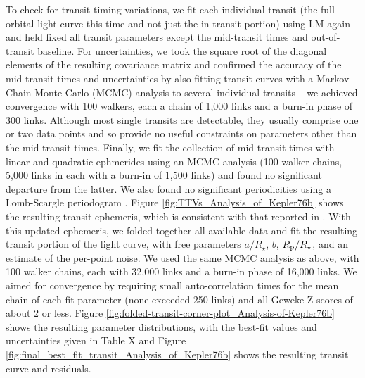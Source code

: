 \documentclass[manuscript]{aastex62}
\begin{document}
To check for transit-timing variations, we fit each individual transit (the full orbital light curve this time and not just the in-transit portion) using LM again and held fixed all transit parameters except the mid-transit times and out-of-transit baseline. For uncertainties, we took the square root of the diagonal elements of the resulting covariance matrix \citep[p.~790]{Press:2007:NRE:1403886} and confirmed the accuracy of the mid-transit times and uncertainties by also fitting transit curves with a Markov-Chain Monte-Carlo (MCMC) analysis \citep{2013PASP..125..306F} to several individual transits -- we achieved convergence with 100 walkers, each a chain of 1,000 links and a burn-in phase of 300 links. Although most single transits are detectable, they usually comprise one or two data points and so provide no useful constraints on parameters other than the mid-transit times. Finally, we fit the collection of mid-transit times with linear and quadratic ephmerides using an MCMC analysis (100 walker chains, 5,000 links in each with a burn-in of 1,500 links) and found no significant departure from the latter. We also found no significant periodicities using a Lomb-Scargle periodogram \citep{1976Ap&SS..39..447L, 1982ApJ...263..835S}. Figure \ref{fig:TTVs_Analysis_of_Kepler76b} shows the resulting transit ephemeris, which is consistent with that reported in \citet{2013ApJ...771...26F}. With this updated ephemeris, we folded together all available data and fit the resulting transit portion of the light curve, with free parameters $a/R_\star$, $b$, $R_{\rm p}/R_\star$, and an estimate of the per-point noise. We used the same MCMC analysis as above, with 100 walker chains, each with 32,000 links and a burn-in phase of 16,000 links. We aimed for convergence by requiring small auto-correlation times \citep[e.g][]{geyer1992} for the mean chain of each fit parameter (none exceeded 250 links) and all Geweke Z-scores \citep{Geweke92evaluatingthe} of about 2 or less. Figure \ref{fig:folded-transit-corner-plot_Analysis-of-Kepler76b} shows the resulting parameter distributions, with the best-fit values and uncertainties given in Table X and Figure \ref{fig:final_best_fit_transit_Analysis_of_Kepler76b} shows the resulting transit curve and residuals.
\end{document}
